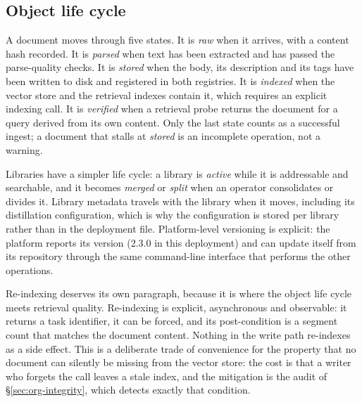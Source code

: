 \subsection{Object life cycle}
\label{sec:lifecycle}

A document moves through five states. It is \emph{raw} when it arrives, with
a content hash recorded. It is \emph{parsed} when text has been extracted and
has passed the parse-quality checks. It is \emph{stored} when the body, its
description and its tags have been written to disk and registered in both
registries. It is \emph{indexed} when the vector store and the retrieval
indexes contain it, which requires an explicit indexing call. It is
\emph{verified} when a retrieval probe returns the document for a query
derived from its own content. Only the last state counts as a successful
ingest; a document that stalls at \emph{stored} is an incomplete operation,
not a warning.

Libraries have a simpler life cycle: a library is \emph{active} while it is
addressable and searchable, and it becomes \emph{merged} or \emph{split} when
an operator consolidates or divides it. Library metadata travels with the
library when it moves, including its distillation configuration, which is why
the configuration is stored per library rather than in the deployment file.
Platform-level versioning is explicit: the platform reports its version
(2.3.0 in this deployment) and can update itself from its repository through
the same command-line interface that performs the other operations.

Re-indexing deserves its own paragraph, because it is where the object life
cycle meets retrieval quality. Re-indexing is explicit, asynchronous and
observable: it returns a task identifier, it can be forced, and its
post-condition is a segment count that matches the document content. Nothing
in the write path re-indexes as a side effect. This is a deliberate trade of
convenience for the property that no document can silently be missing from
the vector store: the cost is that a writer who forgets the call leaves a
stale index, and the mitigation is the audit of \S\ref{sec:org-integrity},
which detects exactly that condition.
